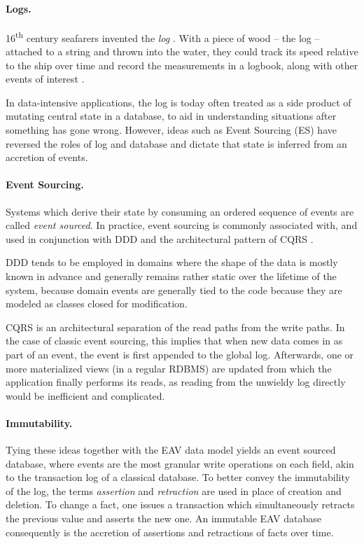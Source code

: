 \paragraph{Logs.} 16\textsuperscript{th} century seafarers invented the \emph{log} \cite{may1973historylog}. With a piece of wood -- the log -- attached to a string and thrown into the water, they could track its speed relative to the ship over time and record the measurements in a logbook, along with other events of interest \cite{kakkar19log}.

In data-intensive applications, the log is today often treated as a side product of mutating central state in a database, to aid in understanding situations after something has gone wrong. However, ideas such as Event Sourcing (ES) have reversed the roles of log and database and dictate that state is inferred from an accretion of events.

\cleardoublepage
\paragraph{Event Sourcing.} Systems which derive their state by consuming an ordered sequence of events are called \emph{event sourced}. In practice, event sourcing is commonly associated with, and used in conjunction with \gls{DDD} \cite{evans2004domain} and the architectural pattern of \gls{CQRS} \cite{kabbedijk2012case}.

DDD tends to be employed in domains where the shape of the data is mostly known in advance and generally remains rather static over the lifetime of the system, because domain events are generally tied to the code because they are modeled as classes closed for modification.

CQRS is an architectural separation of the read paths from the write paths. In the case of classic event sourcing, this implies that when new data comes in as part of an event, the event is first appended to the global log. Afterwards, one or more materialized views (in a regular RDBMS) are updated from which the application finally performs its reads, as reading from  the unwieldy log directly would be inefficient and complicated.

\paragraph{Immutability.} Tying these ideas together with the EAV data model yields an event sourced database, where events are the most granular write operations on each field, akin to the transaction log of a classical database. To better convey the immutability of the log, the terms \emph{assertion} and \emph{retraction} are used in place of creation and deletion. To change a fact, one issues a transaction which simultaneously retracts the previous value and asserts the new one. An immutable EAV database consequently is the accretion of assertions and retractions of facts over time.

